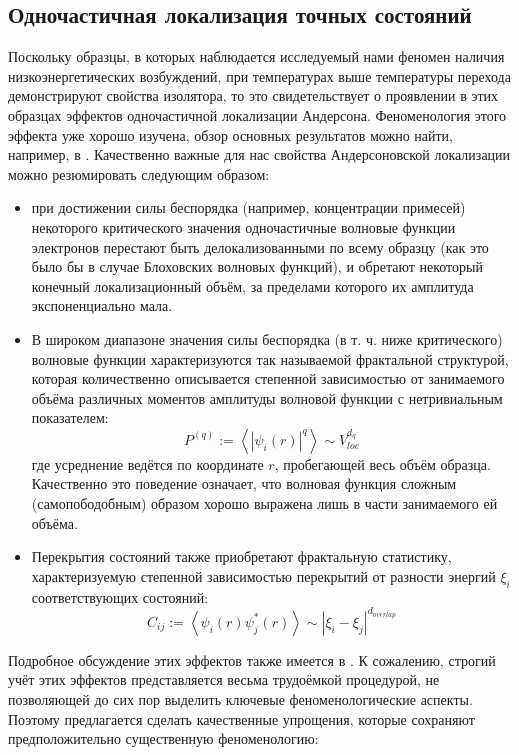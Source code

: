 \subsection{Одночастичная локализация точных состояний}
Поскольку образцы, в которых наблюдается исследуемый нами феномен наличия низкоэнергетических возбуждений, при температурах выше температуры перехода демонстрируют свойства изолятора, то это свидетельствует о проявлении в этих образцах эффектов одночастичной локализации Андерсона. Феноменология этого эффекта уже хорошо изучена, обзор основных результатов можно найти, например, в \cite{Lee_Ramakrishnan_1985}. Качественно важные для нас свойства Андерсоновской локализации можно резюмировать следующим образом: 
\begin{itemize}
	\item при достижении силы беспорядка (например, концентрации примесей) некоторого критического значения одночастичные волновые функции электронов перестают быть делокализованными по всему образцу (как это было бы в случае Блоховских волновых функций), и обретают некоторый конечный локализационный объём, за пределами которого их амплитуда экспоненциально мала.
	\item В широком диапазоне значения силы беспорядка (в т. ч. ниже критического) волновые функции характеризуются так называемой фрактальной структурой, которая количественно описывается степенной зависимостью от занимаемого объёма различных моментов амплитуды волновой функции с нетривиальным показателем:
	$$
	P^{(q)} := \left\langle |\psi_i(r)|^q \right\rangle \sim V_{loc}^{d_q}
	$$
	где усреднение ведётся по координате $r$, пробегающей весь объём образца. Качественно это поведение означает, что волновая функция сложным (самопободобным) образом хорошо выражена лишь в части занимаемого ей объёма.
	\item Перекрытия состояний также приобретают фрактальную статистику, характеризуемую степенной зависимостью перекрытий от разности энергий $\xi_i$ соответствующих состояний:
	$$
	C_{ij} := \left\langle \psi_i(r) \psi_j^{*}(r) \right\rangle \sim \left| \xi_i - \xi_j \right|^{d_{overlap}}
	$$
\end{itemize}
Подробное обсуждение этих эффектов также имеется в \cite{Feigelman2010}. К сожалению, строгий учёт этих эффектов представляется весьма трудоёмкой процедурой, не позволяющей до сих пор выделить ключевые феноменологические аспекты. Поэтому предлагается сделать качественные упрощения, которые сохраняют предположительно существенную феноменологию:

